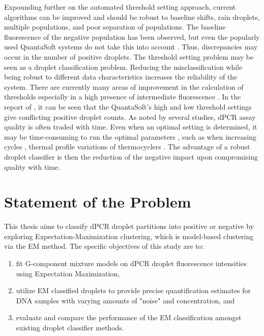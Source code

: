 Expounding further on the automated threshold setting approach, current algorithms can be improved and should be robust to baseline shifts, rain droplets, multiple populations, and poor separation of populations. The baseline fluorescence of the negative population has been observed, but even the popularly used QuantaSoft systems do not take this into account \cite{Trypsteen2015}. Thus, discrepancies may occur in the number of positive droplets. The threshold setting problem may be seen as a droplet classification problem. Reducing the misclassification while being robust to different data characteristics increases the reliability of the system. There are currently many areas of improvement in the calculation of thresholds especially in a high presence of intermediate fluorescence \cite{Demeke2018}. In the report of , it can be seen that the QuantaSoft's high and low threshold settings give conflicting positive droplet counts. As noted by several studies, dPCR assay quality is often traded with time. Even when an optimal setting is determined, it may be time-consuming to run the optimal parameters \cite{Witte2016}, such as when increasing cycles \cite{Lievens2016}, thermal profile variations of thermocyclers \cite{Young2008}. The advantage of a robust droplet classifier is then the reduction of the negative impact upon compromising quality with time.


\section{Statement of the Problem}
\label{sec:statementprob}

This thesis aims to classify dPCR droplet partitions into positive or negative by exploring Expectation-Maximization clustering, which is model-based clustering via the EM method. The specific objectives of this study are to:
\begin{enumerate}
    \item fit G-component mixture models on dPCR droplet fluorescence intensities using Expectation Maximization,
    \item utilize EM classified droplets to provide precise quantification estimates for DNA samples with varying amounts of "noise" and concentration, and
    \item evaluate and compare the performance of the EM classification amongst existing droplet classifier methods. 
\end{enumerate}

